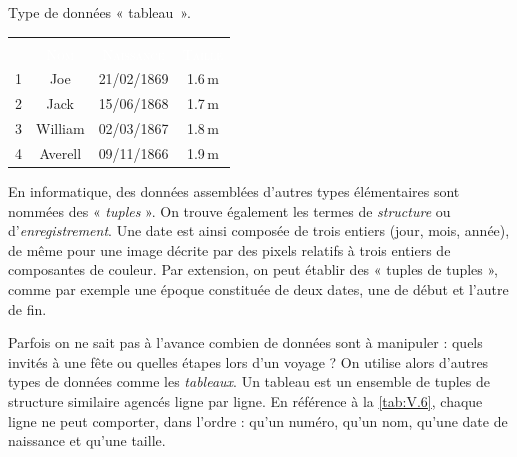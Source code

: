 \begin{margintable}
\caption{\label{tab:V.6}Type de données « tableau~».}
\begingroup
\footnotesize
\renewcommand*{\arraystretch}{1.6}
\begin{tabularx}{\linewidth}{ccXc}
\rowcolor{secondcolor}
\multicolumn{4}{c}{\Gape[6pt]{\textcolor{white}{\textbf{Type de données tableau}}}} \\
\rowcolor{firstcolor}
\multicolumn{1}{c}{\scshape\titlingfont\textcolor{white}{N°}} 
	&	\multicolumn{1}{c}{\scshape\titlingfont\textcolor{white}{Nom}} 
	& \multicolumn{1}{c}{\scshape\titlingfont\textcolor{white}{Naissance}} 
	& \multicolumn{1}{c}{\scshape\titlingfont\textcolor{white}{Taille}}\\
1 & Joe			& 21/02/1869 & \num{1.6}\,m \tabularnewline
2 &	Jack		& 15/06/1868 & \num{1.7}\,m \tabularnewline
3 &	William	& 02/03/1867 & \num{1.8}\,m \tabularnewline
4 & Averell	& 09/11/1866 & \num{1.9}\,m \tabularnewline
\end{tabularx}%
\endgroup
\end{margintable}

En informatique, des données assemblées d'autres types élémentaires sont nommées des « \emph{tuples} ». On trouve également les termes de \emph{structure} ou d'\emph{enregistrement}. Une date est ainsi composée de trois entiers (jour, mois, année), de même pour une image décrite par des pixels relatifs à trois entiers de composantes de couleur.
Par extension, on peut établir des « tuples de tuples », comme par exemple une époque constituée de deux dates, une de début et l'autre de fin.

Parfois on ne sait pas à l'avance combien de données sont à manipuler : quels invités à une fête ou quelles étapes lors d'un voyage ?
On utilise alors d'autres types de données comme les \emph{tableaux}. Un tableau est un ensemble de tuples de structure similaire agencés ligne par ligne. En référence à la \cref{tab:V.6}, chaque ligne ne peut comporter, dans l'ordre : qu'un numéro, qu'un nom, qu'une date de naissance et qu'une taille.


